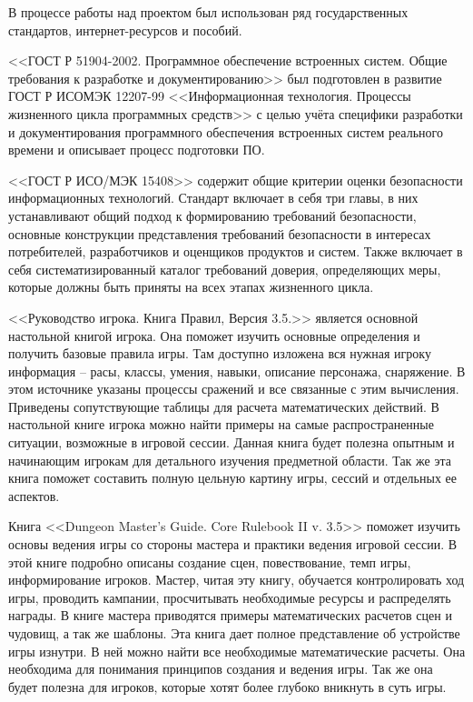 В процессе работы над проектом был использован ряд государственных стандартов, интернет-ресурсов и пособий.

<<ГОСТ Р 51904-2002. Программное обеспечение встроенных систем. Общие требования к разработке и документированию>> был подготовлен в развитие ГОСТ Р ИСО\/МЭК 12207-99 <<Информационная технология. Процессы жизненного цикла программных средств>> с целью учёта специфики разработки и документирования программного обеспечения встроенных систем реального времени и описывает процесс подготовки ПО.

<<ГОСТ Р ИСО/МЭК 15408>> содержит общие критерии оценки безопасности информационных технологий. Стандарт включает в себя три главы, в них устанавливают общий подход к формированию требований безопасности, основные конструкции представления требований безопасности в интересах потребителей, разработчиков и оценщиков продуктов и систем. Также включает в себя систематизированный каталог требований доверия, определяющих меры, которые должны быть приняты на всех этапах жизненного цикла. 

<<Руководство игрока. Книга Правил, Версия 3.5.>> является основной настольной книгой игрока. Она поможет изучить основные определения и получить базовые правила игры. Там доступно изложена вся нужная игроку информация – расы, классы, умения, навыки, описание персонажа, снаряжение. В этом источнике указаны процессы сражений и все связанные с этим вычисления. Приведены сопутствующие таблицы для расчета математических действий. В настольной книге игрока можно найти примеры на самые распространенные ситуации, возможные в игровой сессии. Данная книга будет полезна опытным и начинающим игрокам для детального изучения предметной области. Так же эта книга поможет составить полную цельную картину игры, сессий и отдельных ее аспектов.

Книга <<Dungeon Master's Guide. Core Rulebook II v. 3.5>> поможет изучить основы ведения игры со стороны мастера и практики ведения игровой сессии. В этой книге подробно описаны создание сцен, повествование, темп игры, информирование игроков. Мастер, читая эту книгу, обучается контролировать ход игры, проводить кампании, просчитывать необходимые ресурсы и распределять награды. В книге мастера приводятся примеры математических расчетов сцен и чудовищ, а так же шаблоны. Эта книга дает полное представление об устройстве игры изнутри. В ней можно найти все необходимые математические расчеты. Она необходима для понимания принципов создания и ведения игры. Так же она будет полезна для игроков, которые хотят более глубоко вникнуть в суть игры.

